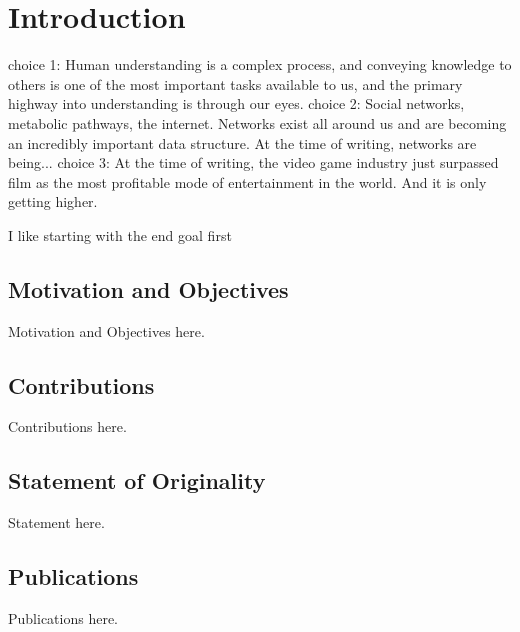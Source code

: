 \chapter{Introduction}
choice 1: Human understanding is a complex process, and conveying knowledge to others is one of the most important tasks available to us, and the primary highway into understanding is through our eyes.
choice 2: Social networks, metabolic pathways, the internet. Networks exist all around us and are becoming an incredibly important data structure. At the time of writing, networks are being...
choice 3: At the time of writing, the video game industry just surpassed film as the most profitable mode of entertainment in the world. And it is only getting higher.

I like starting with the end goal first

\section{Motivation and Objectives}

Motivation and Objectives here.

\section{Contributions}

Contributions here.


\section{Statement of Originality}

Statement here.


\section{Publications}

Publications here.